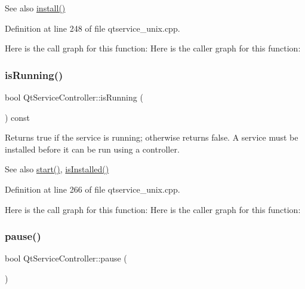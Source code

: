 \begin{DoxySeeAlso}{See also}
\mbox{\hyperlink{class_qt_service_controller_a7e2b85e911ff152557dd25959e76094b}{install()}} 
\end{DoxySeeAlso}


Definition at line 248 of file qtservice\+\_\+unix.\+cpp.

Here is the call graph for this function\+:
Here is the caller graph for this function\+:
\mbox{\label{class_qt_service_controller_a4a11b35468848388174a36af66f25fc3}} 
\subsubsection{\texorpdfstring{is\+Running()}{isRunning()}}
{\footnotesize\ttfamily bool Qt\+Service\+Controller\+::is\+Running (\begin{DoxyParamCaption}{ }\end{DoxyParamCaption}) const}

Returns true if the service is running; otherwise returns false. A service must be installed before it can be run using a controller.

\begin{DoxySeeAlso}{See also}
\mbox{\hyperlink{class_qt_service_controller_a5e9d6da5081d70f31611456d0ef0687e}{start()}}, \mbox{\hyperlink{class_qt_service_controller_a7e36fb18a273118709faf22f732feac4}{is\+Installed()}} 
\end{DoxySeeAlso}


Definition at line 266 of file qtservice\+\_\+unix.\+cpp.

Here is the call graph for this function\+:
Here is the caller graph for this function\+:
\mbox{\label{class_qt_service_controller_aeee2fcc9469f77c7ed8a7955c4fa3a07}} 
\subsubsection{\texorpdfstring{pause()}{pause()}}
{\footnotesize\ttfamily bool Qt\+Service\+Controller\+::pause (\begin{DoxyParamCaption}{ }\end{DoxyParamCaption})}

